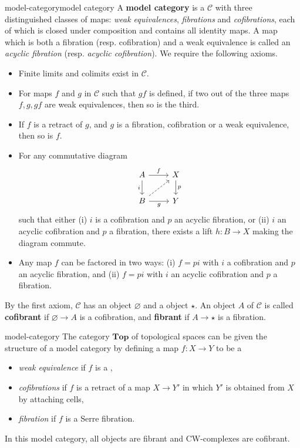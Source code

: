 \begin{topic}{model-category}{model category}
    A \textbf{model category} is a  $\mathcal{C}$ with three distinguished classes of maps: \textit{weak equivalences}, \textit{fibrations} and \textit{cofibrations}, each of which is closed under composition and contains all identity maps. A map which is both a fibration (resp. cofibration) and a weak equivalence is called an \textit{acyclic fibration} (resp. \textit{acyclic cofibration}). We require the following axioms.
    \begin{itemize}
        \item Finite limits and colimits exist in $\mathcal{C}$.
        \item For maps $f$ and $g$ in $\mathcal{C}$ such that $gf$ is defined, if two out of the three maps $f, g, gf$ are weak equivalences, then so is the third.
        \item If $f$ is a retract of $g$, and $g$ is a fibration, cofibration or a weak equivalence, then so is $f$.
        \item For any commutative diagram
        \[ \begin{tikzcd} A \arrow[swap]{d}{i} \arrow{r}{f} & X \arrow{d}{p} \\ B \arrow[swap]{r}{g} \arrow[dashed]{ur} & Y \end{tikzcd} \]
        such that either (i) $i$ is a cofibration and $p$ an acyclic fibration, or (ii) $i$ an acyclic cofibration and $p$ a fibration, there exists a lift $h : B \to X$ making the diagram commute.
        \item Any map $f$ can be factored in two ways: (i) $f = pi$ with $i$ a cofibration and $p$ an acyclic fibration, and (ii) $f = pi$ with $i$ an acyclic cofibration and $p$ a fibration.
    \end{itemize}
    
    By the first axiom, $\mathcal{C}$ has an  object $\varnothing$ and a  object $\star$. An object $A$ of $\mathcal{C}$ is called \textbf{cofibrant} if $\varnothing \to A$ is a cofibration, and \textbf{fibrant} if $A \to \star$ is a fibration.
\end{topic}

\begin{example}{model-category}
    The category $\textbf{Top}$ of topological spaces can be given the structure of a model category by defining a map $f : X \to Y$ to be a
    \begin{itemize}
        \item \textit{weak equivalence} if $f$ is a ,
        \item \textit{cofibrations} if $f$ is a retract of a map $X \to Y'$ in which $Y'$ is obtained from $X$ by attaching cells,
        \item \textit{fibration} if $f$ is a Serre fibration.
    \end{itemize}
    In this model category, all objects are fibrant and CW-complexes are cofibrant.
\end{example}

